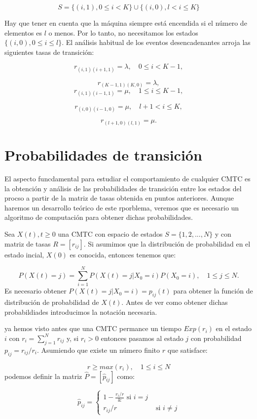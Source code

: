 \documentclass[
]{book}
\theoremstyle{definition}
\theoremstyle{definition}
\theoremstyle{definition}
\theoremstyle{definition}
\theoremstyle{remark}
\begin{document}
\[S = \{(i, 1), 0 \leq i < K\} \cup \{(i, 0), l < i \leq K\}\]

Hay que tener en cuenta que la máquina siempre está encendida si el número de elementos es \(l\) o menos. Por lo tanto, no necesitamos los estados \(\{(i, 0), 0 \leq i \leq l\}\). El análisis habitual de los eventos desencadenantes arroja las siguientes tasas de transición:

\[r_{(i, 1)(i+1, 1)} = \lambda, \quad 0 \leq i < K-1,\]

\[r_{(K-1, 1)(K, 0)} = \lambda, \] \[r_{(i, 1)(i-1, 1)} = \mu, \quad 1\leq i\leq K-1,\]

\[r_{(i, 0)(i-1, 0)} = \mu, \quad l+1 < i\leq K,\]

\[r_{(l+1, 0)(l, 1)} = \mu.\]

\hypertarget{CMTCF}{%
\section{Probabilidades de transición}\label{CMTCF}}

El aspecto funcdamental para estudiar el comportamiento de cualquier CMTC es la obtención y análisis de las probabilidades de transición entre los estados del procso a partir de la matriz de tasas obtenida en puntos anteriores. Aunque haremos un desarrollo teórico de este rporblema, veremos que es necesario un algoritmo de computación para obtener dichas probabilidades.

Sea \(X(t), t \geq 0\) una CMTC con espacio de estados \(S = \{1,2,...,N\}\) y con matriz de tasas \(R = [r_{ij}]\). Si asumimos que la distribución de probabilidad en el estado incial, \(X(0)\) es conocida, entonces tenemos que:

\[P(X(t) = j) = \sum_{i=1}^N P(X(t) = j | X_0 = i)P(X_0 = i), \quad 1 \leq j \leq N.\] Es necesario obtener \(P(X(t) = j | X_0 = i) = p_{ij}(t)\) para obtener la función de distribución de probabilidad de \(X(t)\). Antes de ver como obtener dichas probabildiades introducimos la notación necesaria.

ya hemos visto antes que una CMTC permance un tiempo \(Exp(r_i)\) en el estado \(i\) con \(r_i = \sum_{j=1}^N r_{ij}\) y, si \(r_i > 0\) entonces pasamos al estado \(j\) con probabilidad \(p_{ij} = r_{ij}/r_i\). Asumiendo que existe un número finito \(r\) que satisface:

\[r \geq max(r_i), \quad 1\leq i \leq N\] podemos definir la matriz \(\hat{P} = [\hat{p}_{ij}]\) como:

\begin{equation}
\hat{p}_{ij} = 
\begin{cases} 
1-\frac{r_i/r} & \text{ si } i=j\\
r_{ij}/r & \text{ si } i \neq j
\end{cases}
\end{equation}
\end{document}
